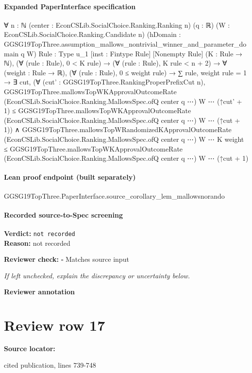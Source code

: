 \documentclass[10pt]{article}
\newcommand{\reviewerbox}{%
  \par\noindent\fbox{\parbox{0.96\linewidth}{\rule{0pt}{0.38in}}}\par
}
\newcommand{\reviewmatch}[1]{%
  \par\noindent\textbf{Reviewer check:} $\square$\; #1\par
  \noindent\emph{If left unchecked, explain the discrepancy or uncertainty below.}\par
}
\begin{document}
\paragraph{Expanded PaperInterface specification}
\begin{ReviewVerbatim}
∀ {n : ℕ} (center : EconCSLib.SocialChoice.Ranking.Ranking n) (q : ℝ) (W : EconCSLib.SocialChoice.Ranking.Candidate n)
  (hDomain : GGSG19TopThree.assumption_mallows_nontrivial_winner_and_parameter_domain q W) {Rule : Type u_1}
  [inst : Fintype Rule] [Nonempty Rule] (K : Rule → ℕ),
  (∀ (rule : Rule), 0 < K rule) →
    (∀ (rule : Rule), K rule < n + 2) →
      ∀ (weight : Rule → ℝ),
        (∀ (rule : Rule), 0 ≤ weight rule) →
          ∑ rule, weight rule = 1 →
            ∃ cut,
              (∀ (cut' : GGSG19TopThree.RankingProperPrefixCut n),
                  GGSG19TopThree.mallowsTopWKApprovalOutcomeRate
                      (EconCSLib.SocialChoice.Ranking.MallowsSpec.ofQ center q ⋯) W ⋯ (↑cut' + 1) ≤
                    GGSG19TopThree.mallowsTopWKApprovalOutcomeRate
                      (EconCSLib.SocialChoice.Ranking.MallowsSpec.ofQ center q ⋯) W ⋯ (↑cut + 1)) ∧
                GGSG19TopThree.mallowsTopWRandomizedKApprovalOutcomeRate
                    (EconCSLib.SocialChoice.Ranking.MallowsSpec.ofQ center q ⋯) W ⋯ K weight ≤
                  GGSG19TopThree.mallowsTopWKApprovalOutcomeRate
                    (EconCSLib.SocialChoice.Ranking.MallowsSpec.ofQ center q ⋯) W ⋯ (↑cut + 1)
\end{ReviewVerbatim}

\paragraph{Lean proof endpoint (built separately)}\begin{ReviewVerbatim}
GGSG19TopThree.PaperInterface.source_corollary_lem_mallowsnorando
\end{ReviewVerbatim}

\paragraph{Recorded source-to-Spec screening}
\textbf{Verdict:} \texttt{not recorded}
\\
\textbf{Reason:} not recorded
\reviewmatch{Matches source input}
\noindent\textbf{Reviewer annotation}\par
\reviewerbox
\clearpage
\hypertarget{source-claim-b02fd12e20da7ee2}{}
\section*{Review row 17}
\textbf{Source locator:} {\footnotesize\raggedright cited publication, lines 739-\allowbreak{}748\par}
\end{document}

